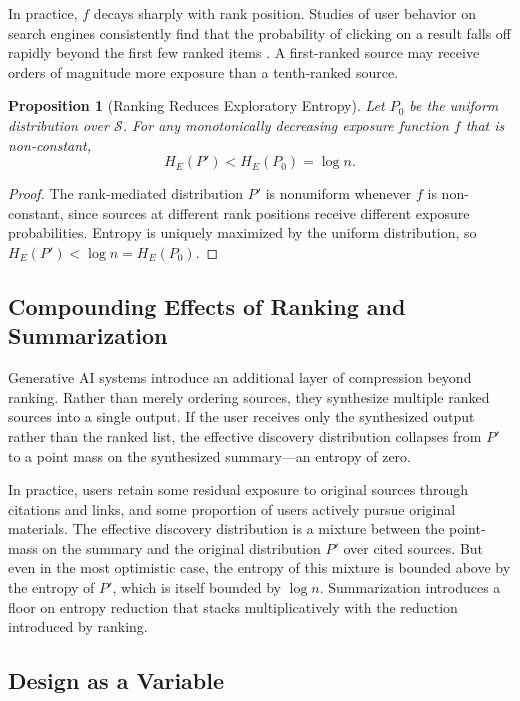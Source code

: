 \documentclass[12pt,a4paper]{article}
\theoremstyle{definition}
\theoremstyle{plain}
\newtheorem{proposition}[definition]{Proposition}
\theoremstyle{remark}
\newcommand{\HE}{H_{E}}
\newcommand{\calS}{\mathcal{S}}
\begin{document}
In practice, $f$ decays sharply with rank position. Studies of user behavior on search
engines consistently find that the probability of clicking on a result falls off rapidly
beyond the first few ranked items \citep{lazer2009,raghavan2023}. A first-ranked source may
receive orders of magnitude more exposure than a tenth-ranked source.

\begin{proposition}[Ranking Reduces Exploratory Entropy]
\label{prop:ranking}
Let $P_0$ be the uniform distribution over $\calS$. For any monotonically decreasing exposure
function $f$ that is non-constant,
\[
\HE(P') < \HE(P_0) = \log n.
\]
\end{proposition}

\begin{proof}
The rank-mediated distribution $P'$ is nonuniform whenever $f$ is non-constant, since
sources at different rank positions receive different exposure probabilities. Entropy is uniquely maximized by the uniform distribution, so
$\HE(P') < \log n = \HE(P_0)$.
\end{proof}

\subsection{Compounding Effects of Ranking and Summarization}

Generative AI systems introduce an additional layer of compression beyond ranking. Rather
than merely ordering sources, they synthesize multiple ranked sources into a single
output. If the user receives only the synthesized output rather than the ranked list, the
effective discovery distribution collapses from $P'$ to a point mass on the synthesized
summary---an entropy of zero.

In practice, users retain some residual exposure to original sources through citations and
links, and some proportion of users actively pursue original materials. The effective
discovery distribution is a mixture between the point-mass on the summary and the original
distribution $P'$ over cited sources. But even in the most optimistic case, the entropy of
this mixture is bounded above by the entropy of $P'$, which is itself bounded by $\log n$.
Summarization introduces a floor on entropy reduction that stacks multiplicatively with the
reduction introduced by ranking.

\subsection{Design as a Variable}
\end{document}

